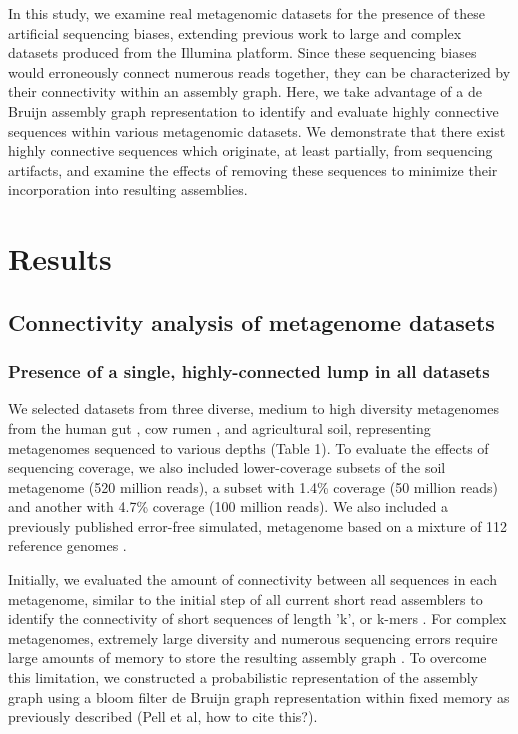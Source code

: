 \documentclass[11pt]{article} %
\begin{document}
In this study, we examine real metagenomic datasets for the presence of these artificial sequencing biases, extending previous work to large and complex datasets produced from the Illumina platform. Since these sequencing biases would erroneously connect numerous reads together, they can be characterized by their connectivity within an assembly graph.  Here, we take advantage of a de Bruijn assembly graph representation to identify and evaluate highly connective sequences within various metagenomic datasets.  We demonstrate that there exist highly connective sequences which originate, at least partially, from sequencing artifacts, and examine the effects of removing these sequences to minimize their incorporation into resulting assemblies.

\section{Results}

\subsection{Connectivity analysis of metagenome datasets}

\subsubsection{Presence of a single, highly-connected lump in all datasets}
We selected datasets from three diverse, medium to high diversity metagenomes from the human gut \cite{Qin:2010p189}, cow rumen \cite{Hess:2011p686}, and agricultural soil, representing metagenomes sequenced to various depths (Table 1).  To evaluate the effects of sequencing coverage, we also included lower-coverage subsets of the soil metagenome (520 million reads),  a subset with 1.4\% coverage (50 million reads) and another with 4.7\% coverage (100 million reads).  We also included a previously published error-free simulated, metagenome based on a mixture of 112 reference genomes \cite{Pignatelli:2011p742}.

Initially, we evaluated the amount of connectivity between all sequences in each metagenome, similar to the initial step of all current short read assemblers to identify the connectivity of short sequences of length 'k', or k-mers \cite{Peng:2011p898,Simpson:2009p233,Zerbino:2008p665}.  For complex metagenomes, extremely large diversity and numerous sequencing errors require large amounts of memory to store the resulting assembly graph \cite{Hess:2011p686,Mackelprang:2011p1087,Qin:2010p189}.  To overcome this limitation, we constructed a probabilistic representation of the assembly graph using a bloom filter de Bruijn graph representation within fixed memory as previously described (Pell et al, how to cite this?).  
\end{document}
